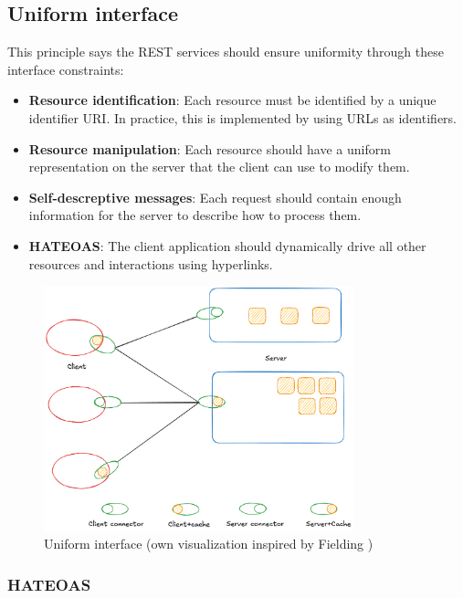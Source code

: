 \subsection{Uniform interface}
This principle says the REST services should ensure uniformity through these interface constraints:

\begin{itemize}
\item \textbf{Resource identification}: Each resource must be identified by a unique identifier URI. In practice, this is implemented by using URLs as identifiers.
\item \textbf{Resource manipulation}: Each resource should have a uniform representation on the server that the client can use to modify them.
\item \textbf{Self-descreptive messages}: Each request should contain enough information for the server to describe how to process them.
\item \textbf{HATEOAS}: The client application should dynamically drive all other resources and interactions using hyperlinks.
\end{itemize}

\begin{figure}[!h]
\centering
\includegraphics[width=0.8\textwidth, keepaspectratio]{figures/uniform-interface.png}
\caption{Uniform interface (own visualization inspired by Fielding \cite{fielding2000})}
\label{fig:uniform-interface}
\end{figure}

\subsubsection{HATEOAS}

